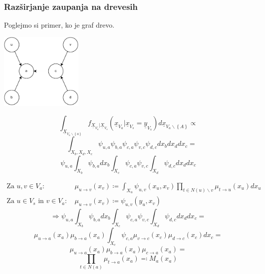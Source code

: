 \documentclass{beamer}
\renewcommand{\vec}{\underline}
\theoremstyle{definition}
\begin{document}
  \begin{frame}
    \frametitle{Razširjanje zaupanja na drevesih}
    Poglejmo si primer, ko je graf drevo.
    \setlength{\columnsep}{-5cm}
    \begin{multicols}{2}
      \includegraphics[width=4cm]{message_passing.pdf}
      \columnbreak{}

      \vspace{5cm}
      $$
      \int_{\vec{X}_{V_a \backslash \left\{a\right\}}} f_{\vec{X}_{V_a} | \vec{X}_{V_s}}\left(\vec{x}_{V_a} | \vec{x}_{V_s} = \vec{y}_{V_s}\right)
      d\vec{x}_{V_a \backslash \left\{A\right\}}\propto
      $$
      $$
      \quad \int_{X_b,X_d,X_c} \psi_{u,a} \psi_{b,a} \psi_{c,a} \psi_{v,c} \psi_{d,c}dx_bdx_ddx_c =
      $$
      \pause
      \vspace{1cm}
      $$
      \psi_{u,a} \int_{X_b} \psi_{b,a}dx_b \int_{X_c} \psi_{c,a} \psi_{v,c}
      \int_{X_d} \psi_{d,c}dx_ddx_c
      $$
    \end{multicols}
  \end{frame}


  \begin{frame}
    \begin{align*}
      \text{Za } u,v \in V_a\text{: } &
      \mu_{u \to v}\left(x_v\right) \coloneqq
      \int_{X_u} \psi_{u,v}\left(x_u,x_v\right)
      \prod_{t\in N\left(u\right)\backslash v}
      \mu_{t \to u}\left(x_u\right)dx_u
      \\
      \text{Za }u \in V_s\text{ in }v \in V_a\text{: } &
      \mu_{u \to v}\left(x_v\right) \coloneqq
      \psi_{u,v}\left(y_u,x_v\right)
    \end{align*}
    \pause
    $$
    \Rightarrow
    \psi_{u,a} \int_{X_b} \psi_{b,a}dx_b \int_{X_c} \psi_{c,a} \psi_{v,c}
    \int_{X_d} \psi_{d,c}dx_ddx_c=
    $$
    \pause
    $$
    \mu_{u \to a}\left(x_a\right)\mu_{b \to a}\left(x_a\right)
    \int_{X_c} \psi_{c,a}
    \mu_{v \to c}\left(x_c\right)
    \mu_{d \to c}\left(x_c\right)dx_c=
    $$
    \pause
    $$
    \mu_{u \to a}\left(x_a\right)\mu_{b \to a}\left(x_a\right)
    \mu_{c \to a}\left(x_a\right) =
    $$
    $$
    \prod_{t \in N\left(a\right)}\mu_{t \to a}\left(x_a\right) \eqqcolon M_a\left(x_a\right)
    $$
  \end{frame}
\end{document}
